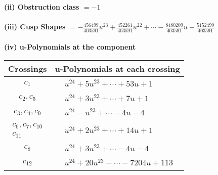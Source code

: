 \documentclass[1p]{elsarticle_modified}
\theoremstyle{definition}
\begin{document}
\flushleft \textbf{(ii) Obstruction class $= -1$}\\~\\
\flushleft \textbf{(iii) Cusp Shapes $= -\frac{456499}{403591} u^{23}+\frac{452261}{403591} u^{22}+\cdots-\frac{8480209}{403591} u-\frac{5152499}{403591}$}\\~\\
\newpage\renewcommand{\arraystretch}{1}
\flushleft \textbf{(iv) u-Polynomials at the component}\newline \\
\begin{tabular}{m{50pt}|m{274pt}}
Crossings & \hspace{64pt}u-Polynomials at each crossing \\
\hline $$\begin{aligned}c_{1}\end{aligned}$$&$\begin{aligned}
&u^{24}+5 u^{23}+\cdots+53 u+1
\end{aligned}$\\
\hline $$\begin{aligned}c_{2},c_{5}\end{aligned}$$&$\begin{aligned}
&u^{24}+3 u^{23}+\cdots+7 u+1
\end{aligned}$\\
\hline $$\begin{aligned}c_{3},c_{4},c_{9}\end{aligned}$$&$\begin{aligned}
&u^{24}- u^{23}+\cdots-4 u-4
\end{aligned}$\\
\hline $$\begin{aligned}c_{6},c_{7},c_{10}\\c_{11}\end{aligned}$$&$\begin{aligned}
&u^{24}+2 u^{23}+\cdots+14 u+1
\end{aligned}$\\
\hline $$\begin{aligned}c_{8}\end{aligned}$$&$\begin{aligned}
&u^{24}+3 u^{23}+\cdots-4 u-4
\end{aligned}$\\
\hline $$\begin{aligned}c_{12}\end{aligned}$$&$\begin{aligned}
&u^{24}+20 u^{23}+\cdots-7204 u+113
\end{aligned}$\\
\hline
\end{tabular}\\~\\
\end{document}
